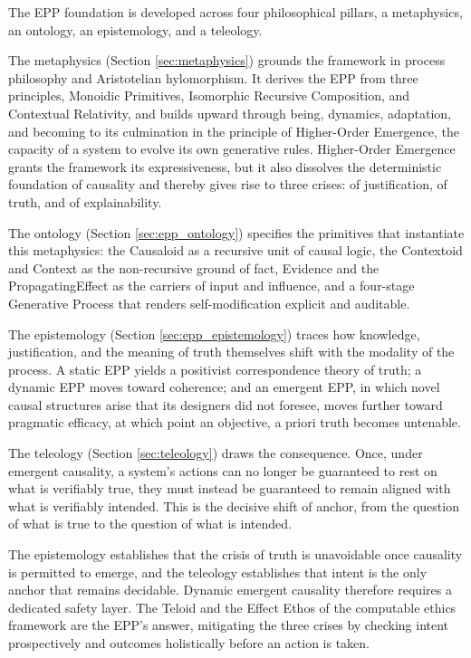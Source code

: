 The EPP foundation is developed across four philosophical pillars, a metaphysics, an ontology, an epistemology, and a teleology.

The metaphysics (Section \ref{sec:metaphysics}) grounds the framework in process philosophy and Aristotelian hylomorphism. It derives the EPP from three principles, Monoidic Primitives, Isomorphic Recursive Composition, and Contextual Relativity, and builds upward through being, dynamics, adaptation, and becoming to its culmination in the principle of Higher-Order Emergence, the capacity of a system to evolve its own generative rules. Higher-Order Emergence grants the framework its expressiveness, but it also dissolves the deterministic foundation of causality and thereby gives rise to three crises: of justification, of truth, and of explainability.

The ontology (Section \ref{sec:epp_ontology}) specifies the primitives that instantiate this metaphysics: the Causaloid as a recursive unit of causal logic, the Contextoid and Context as the non-recursive ground of fact, Evidence and the PropagatingEffect as the carriers of input and influence, and a four-stage Generative Process that renders self-modification explicit and auditable.

The epistemology (Section \ref{sec:epp_epistemology}) traces how knowledge, justification, and the meaning of truth themselves shift with the modality of the process. A static EPP yields a positivist correspondence theory of truth; a dynamic EPP moves toward coherence; and an emergent EPP, in which novel causal structures arise that its designers did not foresee, moves further toward pragmatic efficacy, at which point an objective, a priori truth becomes untenable.

The teleology (Section \ref{sec:teleology}) draws the consequence. Once, under emergent causality, a system's actions can no longer be guaranteed to rest on what is verifiably true, they must instead be guaranteed to remain aligned with what is verifiably intended. This is the decisive shift of anchor, from the question of what is true to the question of what is intended.

The epistemology establishes that the crisis of truth is unavoidable once causality is permitted to emerge, and the teleology establishes that intent is the only anchor that remains decidable. Dynamic emergent causality therefore requires a dedicated safety layer. The Teloid and the Effect Ethos of the computable ethics framework are the EPP's answer, mitigating the three crises by checking intent prospectively and outcomes holistically before an action is taken.

